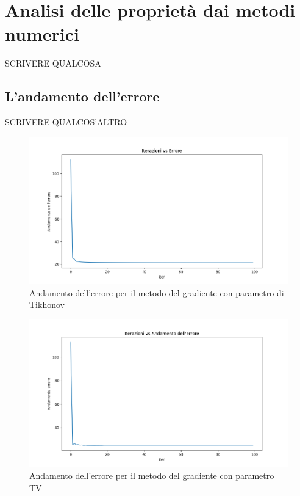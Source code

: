 \documentclass[12pt]{article}
\begin{document}
    \newpage

\section{Analisi delle proprietà dai metodi numerici}
    SCRIVERE QUALCOSA
    
    \subsection{L'andamento dell'errore}
    SCRIVERE QUALCOS'ALTRO
    
    \begin{figure}[h!]
    \centering
    \includegraphics[width=15cm]{errors}
    \caption{Andamento dell'errore per il metodo del gradiente con parametro di Tikhonov}
    \label{graph:1}
    \end{figure}
    
    \begin{figure}[h!]
    \centering
    \includegraphics[width=15cm]{errors_totvar}
    \caption{Andamento dell'errore per il metodo del gradiente con parametro TV}
    \label{graph:2}
    \end{figure}
    
\end{document}
